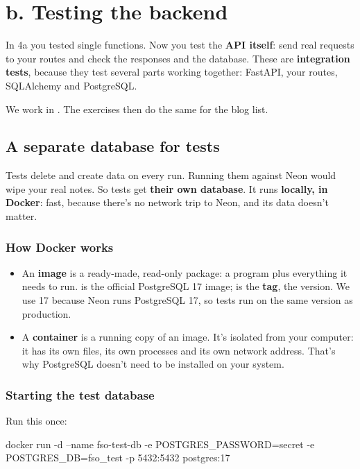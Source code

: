 \section{b. Testing the backend}

In 4a you tested single functions. Now you test the \textbf{API itself}: send real requests to your routes and check the responses and the database. These are \textbf{integration tests}, because they test several parts working together: FastAPI, your routes, SQLAlchemy and PostgreSQL.

We work in . The exercises then do the same for the blog list.

\subsection{A separate database for tests}

Tests delete and create data on every run. Running them against Neon would wipe your real notes. So tests get \textbf{their own database}. It runs \textbf{locally, in Docker}: fast, because there's no network trip to Neon, and its data doesn't matter.

\subsubsection{How Docker works}

\begin{itemize}
\item An \textbf{image} is a ready-made, read-only package: a program plus everything it needs to run.  is the official PostgreSQL 17 image;  is the \textbf{tag}, the version. We use 17 because Neon runs PostgreSQL 17, so tests run on the same version as production.
\item A \textbf{container} is a running copy of an image. It's isolated from your computer: it has its own files, its own processes and its own network address. That's why PostgreSQL doesn't need to be installed on your system.
\end{itemize}

\subsubsection{Starting the test database}

Run this once:

\begin{code}
docker run -d --name fso-test-db -e POSTGRES_PASSWORD=secret -e POSTGRES_DB=fso_test -p 5432:5432 postgres:17
\end{code}

